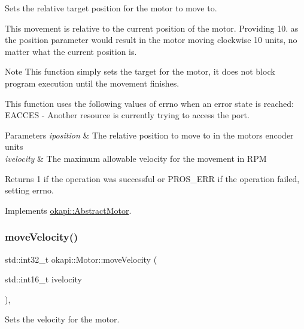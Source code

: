 Sets the relative target position for the motor to move to.

This movement is relative to the current position of the motor. Providing 10. as the position parameter would result in the motor moving clockwise 10 units, no matter what the current position is.

\begin{DoxyNote}{Note}
This function simply sets the target for the motor, it does not block program execution until the movement finishes.
\end{DoxyNote}
This function uses the following values of errno when an error state is reached\+: E\+A\+C\+C\+ES -\/ Another resource is currently trying to access the port.


\begin{DoxyParams}{Parameters}
{\em iposition} & The relative position to move to in the motor\textquotesingle{}s encoder units \\
\hline
{\em ivelocity} & The maximum allowable velocity for the movement in R\+PM \\
\hline
\end{DoxyParams}
\begin{DoxyReturn}{Returns}
1 if the operation was successful or P\+R\+O\+S\+\_\+\+E\+RR if the operation failed, setting errno. 
\end{DoxyReturn}


Implements \mbox{\hyperlink{classokapi_1_1AbstractMotor_a5a65d70a30f536593326cb754700e240}{okapi\+::\+Abstract\+Motor}}.

\mbox{\label{classokapi_1_1Motor_afc3377b9b10a72de0c22e9a74cbcfd16}} 
\subsubsection{\texorpdfstring{moveVelocity()}{moveVelocity()}}
{\footnotesize\ttfamily std\+::int32\+\_\+t okapi\+::\+Motor\+::move\+Velocity (\begin{DoxyParamCaption}\item[{std\+::int16\+\_\+t}]{ivelocity }\end{DoxyParamCaption})\hspace{0.3cm}{\ttfamily [override]}, {\ttfamily [virtual]}}

Sets the velocity for the motor.

